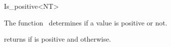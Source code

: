 \begin{ccRefFunctionObjectClass}{Is_positive<NT>}

\ccDefinition

The function \ccRefName\ determines if a value is positive or not.


\ccIsModel
{}

{returns  if  is positive and  otherwise.}

\end{ccRefFunctionObjectClass}

